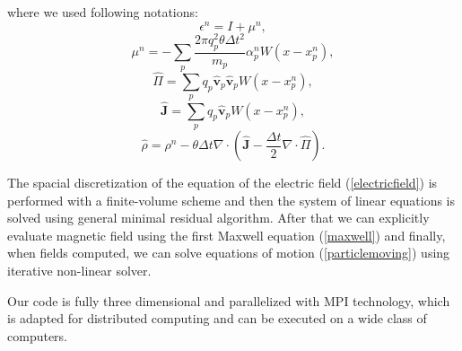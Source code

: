 where we used following notations:
\begin{equation}
 \epsilon^n=I+\mu^n ,
\end{equation}
\begin{equation}
\mu^n=-\sum_p\frac{2\pi q_p^2\theta\Delta t^2}{m_p}\alpha_p^n W\left(x-x_p^n\right),
\end{equation}
\begin{equation}
\widehat{\Pi}=\sum_p q_p\widehat{\textbf{v}}_p\widehat{\textbf{v}}_p W\left(x-x_p^n\right),
\end{equation}
\begin{equation}
\widehat{\textbf{J}}=\sum_p q_p \widehat{\textbf{v}}_p W\left(x-x_p^n\right),
\end{equation}
\begin{equation}
\widehat{\rho}=\rho^n - \theta \Delta t \nabla\cdot\left(\widehat{\textbf{J}} -\frac{\Delta t}{2}\nabla\cdot\widehat{\Pi} \right).
\end{equation}

The spacial discretization of the equation of the electric field (\ref{electricfield}) is performed with a finite-volume scheme and  then the system of linear equations is solved using general minimal residual algorithm. After that we can explicitly evaluate magnetic field using the first Maxwell equation (\ref{maxwell}) and finally, when fields computed, we can solve equations of motion (\ref{particlemoving}) using iterative non-linear solver.

Our code is fully three dimensional and parallelized with MPI technology, which is adapted for distributed computing and can be executed on a wide class of computers.
